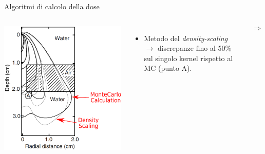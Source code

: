 \documentclass{beamer}
\begin{document}
\begin{frame}{Algoritmi di calcolo della dose}
\begin{columns}[t]
\includegraphics[width=\textwidth]{../cap1/kern_dens_pres.png}
\scriptsize
\begin{itemize}
\item Metodo del \textit{density-scaling} $\rightarrow$ discrepanze fino al 50\% sul singolo kernel rispetto al MC (punto A).
\end{itemize}
\vspace{-3cm}
\large $$\Rightarrow$$

\end{columns}
\end{frame}
\end{document}

